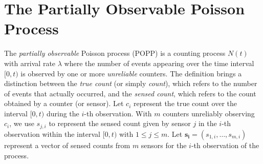 
\section{The Partially Observable Poisson Process}
\label{sec:popp}

The \emph{partially observable} Poisson process (POPP) is a counting process $N(t)$ with arrival rate $\lambda$ where the number of events appearing over the time interval $[0, t)$ is observed by one or more \emph{unreliable} counters. 
% 
The definition brings a distinction between the \emph{true count} (or simply \emph{count}), which refers to the number of events that actually occurred, and the \emph{sensed count}, which refers to the count obtained by a counter (or sensor). Let $c_i$ represent the true count over the interval $[0, t)$ during the $i$-th observation. With $m$ counters unreliably observing $c_i$, we use  $s_{j,i}$ to represent the sensed count given by sensor $j$ in the $i$-th observation within the interval $[0, t)$ with $1 \leq j \leq m$. Let $\mathbf{s_i} = (s_{1,i}, \ldots, s_{m,i})$ represent a vector of sensed counts from $m$ sensors for the $i$-th observation of the process. 


